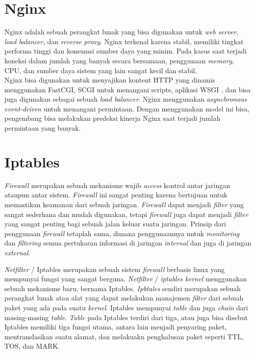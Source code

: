 \section{Nginx}
Nginx adalah sebuah perangkat lunak yang bisa digunakan untuk \textit{web server}, \textit{load balancer}, dan \textit{reverse proxy}. Nginx terkenal karena stabil, memiliki tingkat performa tinggi dan konsumsi sumber daya yang minim. Pada kasus saat terjadi koneksi dalam jumlah yang banyak secara bersamaan, penggunaan \textit{memory}, CPU, dan sumber daya sistem yang lain sangat kecil dan stabil. \cite{bab2-nginx}\\
\indent Nginx bisa digunakan untuk menyajikan kontent HTTP yang dinamis menggunakan FastCGI, SCGI untuk menangani scripts, aplikasi WSGI , dan bisa juga digunakan sebagai sebuah \textit{load balancer}. Nginx menggunakan \textit{asynchronous event-driven} untuk menangani permintaan. Dengan menggunakan model ini bisa, pengembang bisa melakukan predeksi kinerja Nginx saat terjadi jumlah permintaan yang banyak.

\section{Iptables} 
\textit{Firewall} merupakan sebuah mekanisme wajib \textit{access} kontrol antar jaringan ataupun antar sistem. \textit{Firewall} ini sangat penting karena bertujuan untuk memastikan keamanan dari sebuah jaringan. \textit{Firewall} dapat menjadi \textit{filter} yang sangat sederhana dan mudah digunakan, tetapi \textit{firewall} juga dapat menjadi \textit{filter} yang sangat penting bagi sebuah jalan keluar suatu jaringan. Prinsip dari penggunaan \textit{firewall} tetaplah sama, dimana penggunaannya untuk \textit{monitoring} dan \textit{filtering} semua pertukaran informasi di jaringan \textit{internal} dan juga di jaringan \textit{external}.

\textit{Netfilter} / Iptables merupakan sebuah sistem \textit{firewall} berbasis linux yang mempunyai fungsi yang sangat berguna. \textit{Netfilter} / \textit{iptables kernel} menggunakan sebuah mekanisme baru, bernama Iptables. \textit{Ipbtales} sendiri merupakan sebuah perangkat lunak atau alat yang dapat melakukan manajemen \textit{filter} dari sebuah paket yang ada pada suatu \textit{kernel}. Iptables mempunyai \textit{table} dan juga \textit{chain} dari masing-masing \textit{table}. \textit{Table} pada Iptables terdiri dari tiga, atau juga bisa disebut Iptables memiliki tiga fungsi utama, antara lain menjadi penyaring paket, mentranslasikan suatu alamat, dan melakuakn penghalusan paket seperti TTL, TOS, dan MARK. \cite{bab2-iptables}


